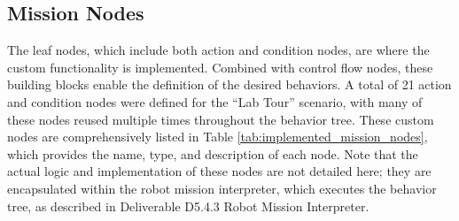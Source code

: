 \documentclass{CSSRforAfrica}
\begin{document}
\subsection{Mission Nodes}
\label{section:mission_nodes}

The leaf nodes, which include both action and condition nodes, are where the custom functionality is implemented. Combined with control flow nodes, these building blocks enable the definition of the desired behaviors. A total of 21 action and condition nodes were defined for the ``Lab Tour'' scenario, with many of these nodes reused multiple times throughout the behavior tree. These custom nodes are comprehensively listed in Table \ref{tab:implemented_mission_nodes}, which provides the name, type, and description of each node. Note that the actual logic and implementation of these nodes are not detailed here; they are encapsulated within the robot mission interpreter, which executes the behavior tree, as described in Deliverable D5.4.3 Robot Mission Interpreter.
\end{document}
